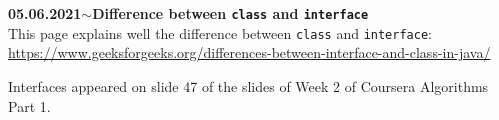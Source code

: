 \documentclass[11pt,a4paper]{article}
\newenvironment{loggentry}[2]%
{\noindent\textbf{#1}\hspace{1cm}$\mathbf{\sim}$\text{ }\textbf{#2}\\}{\vspace{0.5cm}}
\begin{document}
\begin{loggentry}{05.06.2021}{Difference between \texttt{class} and \texttt{interface}}

This page explains well the difference between \texttt{class} and \texttt{interface}:\\
\url{https://www.geeksforgeeks.org/differences-between-interface-and-class-in-java/}

Interfaces appeared on slide 47 of the slides of Week 2 of Coursera Algorithms Part 1.

\end{loggentry}
\end{document}

